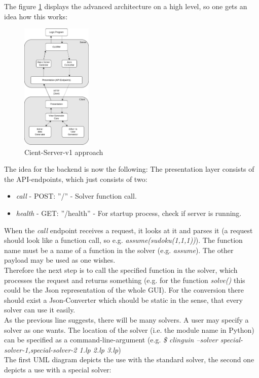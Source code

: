 \documentclass[12pt,a4paper]{article}
\newcommand{\<}[1]{\guilsinglleft}
\renewcommand{\>}[1]{\guilsinglright}
\begin{document}
\noindent The figure \ref{fig:client-server-v1} displays the advanced architecture on a high level, so one gets an idea how this works:

\begin{figure}[ht]
    \begin{center}
    \includegraphics[width=0.3\textwidth]{imgs/client-server-v1.png}
    \caption{Cient-Server-v1 approach}
    \label{fig:client-server-v1}
    \end{center}
\end{figure}

\noindent The idea for the backend is now the following: The presentation layer consists of the API-endpoints, which just consists of two:

\begin{itemize}
    \item \textit{call} - POST: ''/'' - Solver function call.
    \item \textit{health} - GET: ''/health'' - For startup process, check if server is running.
\end{itemize}

\noindent When the \textit{call} endpoint receives a request, it looks at it and parses it (a request should look like a function call, so e.g. \textit{assume(sudoku(1,1,1))}). The function name must be a name of a function in the solver (e.g. \textit{assume}). The other payload may be used as one wishes.\\
Therefore the next step is to call the specified function in the solver, which processes the request and returns something (e.g. for the function \textit{solve()} this could be the Json representation of the whole GUI). For the conversion there should exist a Json-Converter which should be static in the sense, that every solver can use it easily.\\
As the previous line suggests, there will be many solvers. A user may specify a solver as one wants. The location of the solver (i.e. the module name in Python) can be specified as a command-line-argument (e.g. \textit{\$ clinguin --solver special-solver-1,special-solver-2 1.lp 2.lp 3.lp})\\[1em]
The first UML diagram depicts the use with the standard solver, the second one depicts a use with a special solver: 
\end{document}

